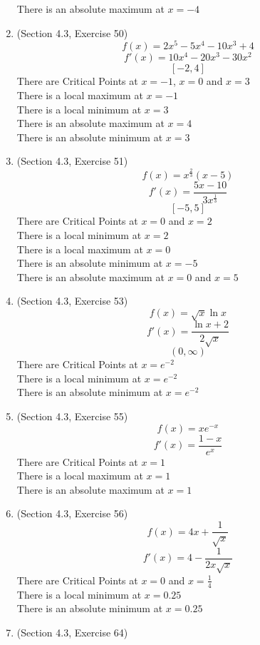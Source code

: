\documentclass{article}
\begin{document}
\begin{enumerate}
        There is an absolute maximum at $x = -4$
    \item (Section 4.3, Exercise 50)
        $$f(x) = 2x^5 - 5x^4 - 10x^3 + 4$$
        $$f'(x) = 10x^4 - 20x^3 - 30x^2$$
        $$[-2, 4]$$
        There are Critical Points at $x = -1$, $x = 0$ and $x = 3$ \\
        There is a local maximum at $x = -1$ \\
        There is a local minimum at $x = 3$ \\
        There is an absolute maximum at $x = 4$ \\
        There is an absolute minimum at $x = 3$ \\
    \item (Section 4.3, Exercise 51)
        $$f(x) = x^{\frac{2}{3}}\left(x - 5\right)$$
        $$f'(x) = \frac{5x - 10}{3x^{\frac{1}{3}}}$$
        $$[-5, 5]$$
        There are Critical Points at $x = 0$ and $x = 2$ \\
        There is a local minimum at $x = 2$ \\
        There is a local maximum at $x = 0$ \\
        There is an absolute minimum at $x = -5$ \\
        There is an absolute maximum at $x = 0$ and $x = 5$
    \item (Section 4.3, Exercise 53)
        $$f(x) = \sqrt{x}\ln{x}$$
        $$f'(x) = \frac{\ln{x} + 2}{2\sqrt{x}}$$
        $$(0, \infty)$$
        There are Critical Points at $x = e^{-2}$ \\
        There is a local minimum at $x = e^{-2}$ \\
        There is an absolute minimum at $x = e^{-2}$
    \item (Section 4.3, Exercise 55)
        $$f(x) = xe^{-x}$$
        $$f'(x) = \frac{1 - x}{e^x}$$
        There are Critical Points at $x = 1$ \\
        There is a local maximum at $x = 1$ \\
        There is an absolute maximum at $x = 1$
    \item (Section 4.3, Exercise 56)
        $$f(x) = 4x + \frac{1}{\sqrt{x}}$$
        $$f'(x) = 4 -\frac{1}{2x\sqrt{x}}$$
        There are Critical Points at $x = 0$ and $x = \frac{1}{4}$ \\
        There is a local minimum at $x = 0.25$ \\
        There is an absolute minimum at $x = 0.25$
    \item (Section 4.3, Exercise 64)

\end{enumerate}
\end{document}
